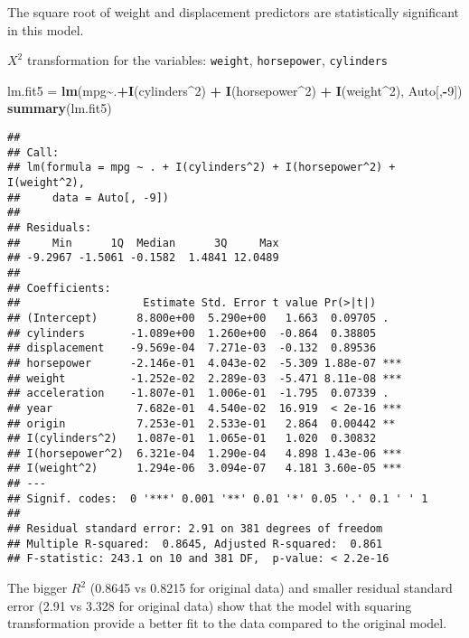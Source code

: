 \documentclass[
]{article}
\newenvironment{Shaded}{\begin{snugshade}}{\end{snugshade}}
\newcommand{\DecValTok}[1]{\textcolor[rgb]{0.00,0.00,0.81}{#1}}
\newcommand{\FunctionTok}[1]{\textcolor[rgb]{0.13,0.29,0.53}{\textbf{#1}}}
\newcommand{\NormalTok}[1]{#1}
\newcommand{\OtherTok}[1]{\textcolor[rgb]{0.56,0.35,0.01}{#1}}
\newcommand{\SpecialCharTok}[1]{\textcolor[rgb]{0.81,0.36,0.00}{\textbf{#1}}}
\begin{document}
The square root of weight and displacement predictors are statistically
significant in this model.

\(X^2\) transformation for the variables: \texttt{weight},
\texttt{horsepower}, \texttt{cylinders}

\begin{Shaded}
\begin{Highlighting}[]
\NormalTok{lm.fit5 }\OtherTok{=} \FunctionTok{lm}\NormalTok{(mpg}\SpecialCharTok{\textasciitilde{}}\NormalTok{.}\SpecialCharTok{+}\FunctionTok{I}\NormalTok{(cylinders}\SpecialCharTok{\^{}}\DecValTok{2}\NormalTok{) }\SpecialCharTok{+} \FunctionTok{I}\NormalTok{(horsepower}\SpecialCharTok{\^{}}\DecValTok{2}\NormalTok{) }\SpecialCharTok{+} \FunctionTok{I}\NormalTok{(weight}\SpecialCharTok{\^{}}\DecValTok{2}\NormalTok{), Auto[,}\SpecialCharTok{{-}}\DecValTok{9}\NormalTok{])}
\FunctionTok{summary}\NormalTok{(lm.fit5)}
\end{Highlighting}
\end{Shaded}

\begin{verbatim}
## 
## Call:
## lm(formula = mpg ~ . + I(cylinders^2) + I(horsepower^2) + I(weight^2), 
##     data = Auto[, -9])
## 
## Residuals:
##     Min      1Q  Median      3Q     Max 
## -9.2967 -1.5061 -0.1582  1.4841 12.0489 
## 
## Coefficients:
##                   Estimate Std. Error t value Pr(>|t|)    
## (Intercept)      8.800e+00  5.290e+00   1.663  0.09705 .  
## cylinders       -1.089e+00  1.260e+00  -0.864  0.38805    
## displacement    -9.569e-04  7.271e-03  -0.132  0.89536    
## horsepower      -2.146e-01  4.043e-02  -5.309 1.88e-07 ***
## weight          -1.252e-02  2.289e-03  -5.471 8.11e-08 ***
## acceleration    -1.807e-01  1.006e-01  -1.795  0.07339 .  
## year             7.682e-01  4.540e-02  16.919  < 2e-16 ***
## origin           7.253e-01  2.533e-01   2.864  0.00442 ** 
## I(cylinders^2)   1.087e-01  1.065e-01   1.020  0.30832    
## I(horsepower^2)  6.321e-04  1.290e-04   4.898 1.43e-06 ***
## I(weight^2)      1.294e-06  3.094e-07   4.181 3.60e-05 ***
## ---
## Signif. codes:  0 '***' 0.001 '**' 0.01 '*' 0.05 '.' 0.1 ' ' 1
## 
## Residual standard error: 2.91 on 381 degrees of freedom
## Multiple R-squared:  0.8645, Adjusted R-squared:  0.861 
## F-statistic: 243.1 on 10 and 381 DF,  p-value: < 2.2e-16
\end{verbatim}

The bigger \(R^2\) (0.8645 vs 0.8215 for original data) and smaller
residual standard error (2.91 vs 3.328 for original data) show that the
model with squaring transformation provide a better fit to the data
compared to the original model.
\end{document}
